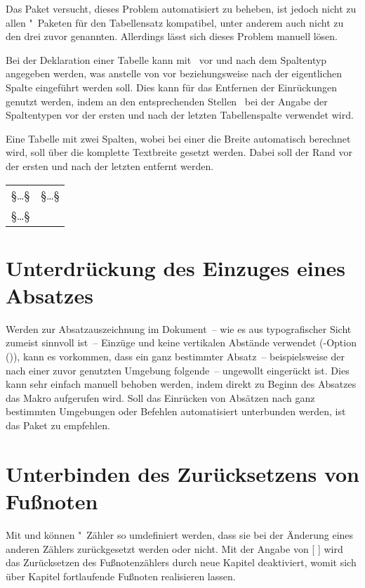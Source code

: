 Das Paket  versucht, dieses Problem automatisiert zu 
beheben, ist jedoch nicht zu allen "~Paketen für den 
Tabellensatz kompatibel, unter anderem auch nicht zu den drei zuvor genannten. 
Allerdings lässt sich dieses Problem manuell lösen. 

Bei der Deklaration einer Tabelle kann mit~\PParameter{\dots} vor und 
nach dem Spaltentyp angegeben werden, was anstelle von  vor 
beziehungsweise nach der eigentlichen Spalte eingeführt werden soll. Dies kann 
für das Entfernen der Einrückungen genutzt werden, indem an den entsprechenden 
Stellen~ bei der Angabe der Spaltentypen vor der ersten 
und nach der letzten Tabellenspalte verwendet wird.
%
\begin{Example}
Eine Tabelle mit zwei Spalten, wobei bei einer die Breite automatisch berechnet 
wird, soll über die komplette Textbreite gesetzt werden. Dabei soll der Rand 
vor der ersten und nach der letzten entfernt werden.
\begin{Code}[escapechar=§]
\begin{tabularx}{\textwidth}{@{}lX@{}}
§\dots§ & §\dots§ \tabularnewline
§\dots§
\end{tabularx}
\end{Code}
\end{Example}




\section{Unterdrückung des Einzuges eines Absatzes}
%
%
Werden zur Absatzauszeichnung im Dokument~-- wie es aus typografischer Sicht 
zumeist sinnvoll ist~-- Einzüge und keine vertikalen Abstände verwendet
(\KOMAScript-Option ()), kann es 
vorkommen, dass ein ganz bestimmter Absatz~-- beispielsweise der nach einer 
zuvor genutzten Umgebung folgende~-- ungewollt eingerückt ist. Dies kann sehr 
einfach manuell behoben werden, indem direkt zu Beginn des Absatzes das Makro 
 aufgerufen wird. Soll das Einrücken von Absätzen nach ganz 
bestimmten Umgebungen oder Befehlen automatisiert unterbunden werden, ist das 
Paket  zu empfehlen.



\section{Unterbinden des Zurücksetzens von Fußnoten}%
%
%
%
Mit  und  können 
"~Zähler so umdefiniert werden, dass sie bei der Änderung eines 
anderen Zählers zurückgesetzt werden oder nicht. Mit der Angabe von 
[%
] wird das Zurücksetzen des Fußnotenzählers durch neue Kapitel 
deaktiviert, womit sich über Kapitel fortlaufende Fußnoten 
realisieren lassen.



